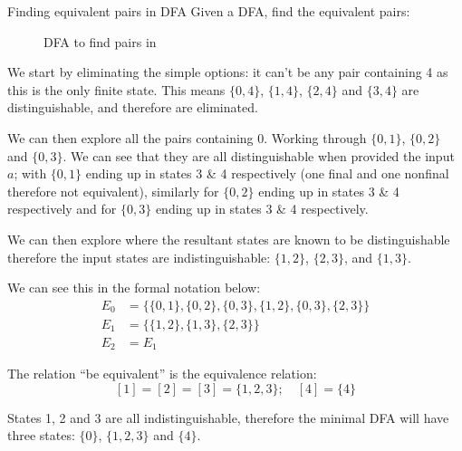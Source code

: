    \begin{example}{Finding equivalent pairs in DFA}
Given a DFA, find the equivalent pairs:

\begin{figure}[H]
    \centering
    \caption{DFA to find pairs in}
    \label{fig:dfa-equivalent-state-eg-2-a}
\end{figure}

We start by eliminating the simple options: it can't be any pair containing 4 as this is the only finite state. This means $\{0,4\}$, $\{1,4\}$, $\{2,4\}$ and $\{3,4\}$ are distinguishable, and therefore are eliminated.

We can then explore all the pairs containing 0. Working through $\{0,1\}$, $\{0,2\}$ and $\{0,3\}$. We can see that they are all distinguishable when provided the input $a$; with $\{0,1\}$ ending up in states 3 \& 4 respectively (one final and one nonfinal therefore not equivalent), similarly for $\{0,2\}$ ending up in states 3 \& 4 respectively and for $\{0,3\}$ ending up in states 3 \& 4 respectively.

We can then explore where the resultant states are known to be distinguishable therefore the input states are indistinguishable: $\{1,2\}$, $\{2,3\}$, and $\{1,3\}$. 


We can see this in the formal notation below:
\begin{align*}
E_0 &= \{\{0,1\}, \{0,2\}, \{0,3\}, \{1,2\}, \{0,3\}, \{2,3\}\}\\
E_1 &= \{\{1,2\}, \{1,3\}, \{2,3\}\}\\
E_2 &= E_1
\end{align*}

The relation ``be equivalent'' is the equivalence relation:
\[[1] = [2] = [3] = \{1, 2, 3\};\quad [4] = \{4\}\]

States 1, 2 and 3 are all indistinguishable, therefore the minimal DFA will have three states: $\{0\}$, $\{1,2,3\}$ and $\{4\}$.

\end{example}

